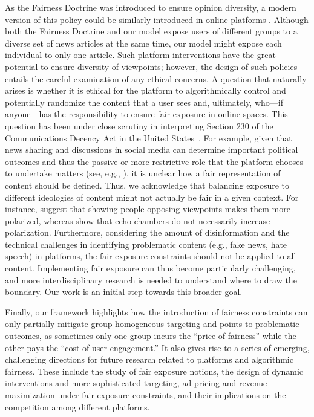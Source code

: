 \documentclass[letterpaper]{article} %
\begin{document}
As the Fairness Doctrine was introduced to ensure opinion diversity, a modern version of this policy could be similarly introduced in online platforms \citep{WP_FairnessDoctrine_2021}.
Although both the Fairness Doctrine and our model expose users of different groups to a diverse set of news articles at the same time, our model might expose each individual to only one article.
%
Such platform interventions have the great potential to ensure diversity of viewpoints; however, the design of such policies entails the careful examination of any ethical concerns. 
%
A question that naturally arises is whether it is ethical for the platform to algorithmically control and potentially randomize the content that a user sees and, ultimately, who---if anyone---has the responsibility to ensure fair exposure in online spaces. 
%
This question has been under close scrutiny in interpreting Section 230 of the Communications Decency Act in the United States~\citep{sec230}. 
%
For example, given that news sharing and discussions in social media can determine important political outcomes and thus the passive or more restrictive role that the platform chooses to undertake matters (see, e.g., \citet{BBC_Trump, FB_NYT2020}), it is unclear how a fair representation of content should be defined.
%
Thus, we acknowledge that balancing exposure to different ideologies of content might not actually be fair in a given context. 
%
For instance, \citet{Bail9216} suggest that showing people opposing viewpoints makes them more polarized, whereas \citet{Becker10717} show that echo chambers do not necessarily increase polarization.
%
Furthermore, considering the amount of disinformation and the technical challenges in identifying problematic content (e.g.,  fake news, hate speech) in platforms, the fair exposure constraints should not be applied to all content.
%
Implementing fair exposure can thus become particularly challenging, and more interdisciplinary research is needed to understand where to draw the boundary.
%
Our work is an initial step towards this broader goal.

Finally, our framework highlights how the introduction of fairness constraints can only partially mitigate group-homogeneous targeting and points to problematic outcomes, as sometimes only one group incurs the ``price of fairness'' while the other pays the ``cost of user engagement.''
%
It also gives rise to a series of emerging, challenging directions for future research related to platforms and algorithmic fairness.
%
These include the study of fair exposure notions, the design of dynamic interventions and more sophisticated targeting, ad pricing and revenue maximization under fair exposure constraints, and their implications on the competition among different platforms.
\end{document}
